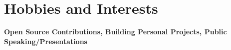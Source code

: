 \section{Hobbies and Interests}
\vspace{2pt}
\resumeSubHeadingListStart
\small{\item{

                  \textbf{Open Source Contributions, Building Personal Projects, Public Speaking/Presentations} \\ \vspace{3pt}




            }}
\resumeSubHeadingListEnd
